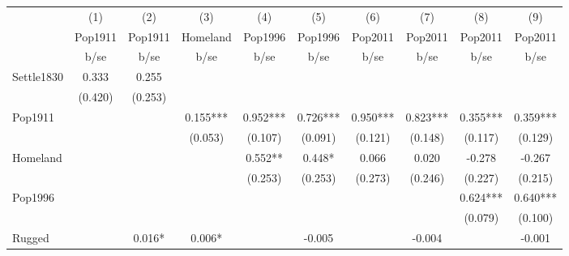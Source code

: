 {
\def\sym#1{\ifmmode^{#1}\else\(^{#1}\)\fi}
\begin{tabular}{l*{9}{c}}
\hline\hline
                    &\multicolumn{1}{c}{(1)}&\multicolumn{1}{c}{(2)}&\multicolumn{1}{c}{(3)}&\multicolumn{1}{c}{(4)}&\multicolumn{1}{c}{(5)}&\multicolumn{1}{c}{(6)}&\multicolumn{1}{c}{(7)}&\multicolumn{1}{c}{(8)}&\multicolumn{1}{c}{(9)}\\
                    &\multicolumn{1}{c}{Pop1911}&\multicolumn{1}{c}{Pop1911}&\multicolumn{1}{c}{Homeland}&\multicolumn{1}{c}{Pop1996}&\multicolumn{1}{c}{Pop1996}&\multicolumn{1}{c}{Pop2011}&\multicolumn{1}{c}{Pop2011}&\multicolumn{1}{c}{Pop2011}&\multicolumn{1}{c}{Pop2011}\\
                    &        b/se   &        b/se   &        b/se   &        b/se   &        b/se   &        b/se   &        b/se   &        b/se   &        b/se   \\
\hline
Settle1830          &       0.333   &       0.255   &               &               &               &               &               &               &               \\
                    &     (0.420)   &     (0.253)   &               &               &               &               &               &               &               \\
Pop1911             &               &               &       0.155***&       0.952***&       0.726***&       0.950***&       0.823***&       0.355***&       0.359***\\
                    &               &               &     (0.053)   &     (0.107)   &     (0.091)   &     (0.121)   &     (0.148)   &     (0.117)   &     (0.129)   \\
Homeland            &               &               &               &       0.552** &       0.448*  &       0.066   &       0.020   &      -0.278   &      -0.267   \\
                    &               &               &               &     (0.253)   &     (0.253)   &     (0.273)   &     (0.246)   &     (0.227)   &     (0.215)   \\
Pop1996             &               &               &               &               &               &               &               &       0.624***&       0.640***\\
                    &               &               &               &               &               &               &               &     (0.079)   &     (0.100)   \\
Rugged              &               &       0.016*  &       0.006*  &               &      -0.005   &               &      -0.004   &               &      -0.001   \\

\end{tabular}}

